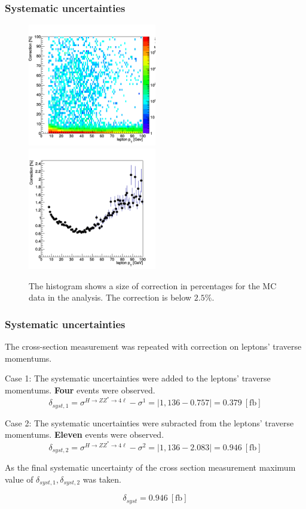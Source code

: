 \documentclass[aspectratio=1610, english]{beamer}
\newcommand{\hzz}{ H\rightarrow ZZ^{*}\rightarrow 4 \ell}
\begin{document}
\begin{frame}
\frametitle{Systematic uncertainties}

\begin{figure} [H]
\centering
\includegraphics[width=0.5\textwidth]{syst1_signal.png}\hfill
\includegraphics[width=0.5\textwidth]{syst2_signal.png}
\caption{The histogram shows a size of correction in percentages for the MC data in the analysis. The correction is below $2.5\%$. }
\end{figure}

\end{frame}

\begin{frame}
\frametitle{Systematic uncertainties}
The cross-section measurement was repeated with correction on leptons' traverse momentums.\\
\vspace{0.5cm}

Case 1: The systematic uncertainties were added to the leptons' traverse momentums.
\textbf{Four} events were observed.
\begin{equation}
\delta_{syst, 1} = \sigma^{\hzz} - \sigma^1 = | 1,136 - 0.757 | = 0.379 \: [\mathrm{fb}]
\end{equation}

Case 2: The systematic uncertainties were subracted from the leptons' traverse momentums.
\textbf{Eleven} events were observed.
\begin{equation}
\delta_{syst, 2} = \sigma^{\hzz} - \sigma^2 = | 1,136 - 2.083 | = 0.946 \: [\mathrm{fb}]
\end{equation}

As the final systematic uncertainty of the cross section measurement maximum value of $\delta_{syst, 1}, \delta_{syst, 2}$ was taken.

\begin{equation}
\delta_{syst} = 0.946 \: [\mathrm{fb}]
\end{equation}

\end{frame}
\end{document}
